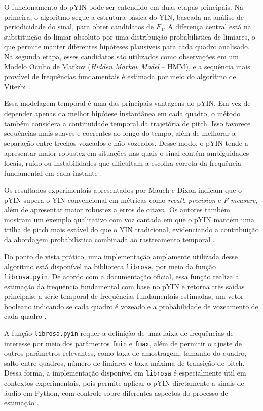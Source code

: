 O funcionamento do pYIN pode ser entendido em duas etapas principais. Na primeira, o algoritmo segue a estrutura básica do YIN, baseada na análise de periodicidade do sinal, para obter candidatos de \(F_0\). A diferença central está na substituição do limiar absoluto por uma distribuição probabilística de limiares, o que permite manter diferentes hipóteses plausíveis para cada quadro analisado. Na segunda etapa, esses candidatos são utilizados como observações em um Modelo Oculto de Markov (\textit{Hidden Markov Model} -- HMM), e a sequência mais provável de frequências fundamentais é estimada por meio do algoritmo de Viterbi \cite{mauch2014pyin}.

Essa modelagem temporal é uma das principais vantagens do pYIN. Em vez de depender apenas da melhor hipótese instantânea em cada quadro, o método também considera a continuidade temporal da trajetória de pitch. Isso favorece sequências mais suaves e coerentes ao longo do tempo, além de melhorar a separação entre trechos vozeados e não vozeados. Desse modo, o pYIN tende a apresentar maior robustez em situações nas quais o sinal contém ambiguidades locais, ruído ou instabilidades que dificultam a escolha correta da frequência fundamental em cada instante \cite{mauch2014pyin}.

Os resultados experimentais apresentados por Mauch e Dixon indicam que o pYIN supera o YIN convencional em métricas como \textit{recall}, \textit{precision} e \textit{F-measure}, além de apresentar maior robustez a erros de oitava. Os autores também mostram um exemplo qualitativo com voz cantada em que o pYIN mantém uma trilha de pitch mais estável do que o YIN tradicional, evidenciando a contribuição da abordagem probabilística combinada ao rastreamento temporal \cite{mauch2014pyin}.

Do ponto de vista prático, uma implementação amplamente utilizada desse algoritmo está disponível na biblioteca \texttt{librosa}, por meio da função \texttt{librosa.pyin}. De acordo com a documentação oficial, essa função realiza a estimação da frequência fundamental com base no pYIN e retorna três saídas principais: a série temporal de frequências fundamentais estimadas, um vetor booleano indicando se cada quadro é vozeado e a probabilidade de vozeamento de cada quadro \cite{librosa_pyin_docs}.

A função \texttt{librosa.pyin} requer a definição de uma faixa de frequências de interesse por meio dos parâmetros \texttt{fmin} e \texttt{fmax}, além de permitir o ajuste de outros parâmetros relevantes, como taxa de amostragem, tamanho do quadro, salto entre quadros, número de limiares e taxa máxima de transição de pitch. Dessa forma, a implementação disponível em \texttt{librosa} é especialmente útil em contextos experimentais, pois permite aplicar o pYIN diretamente a sinais de áudio em Python, com controle sobre diferentes aspectos do processo de estimação \cite{librosa_pyin_docs}.

